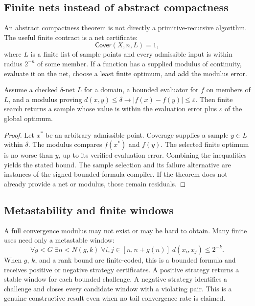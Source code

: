 \subsection{Finite nets instead of abstract compactness}

An abstract compactness theorem is not directly a primitive-recursive
algorithm.  The useful finite contract is a net certificate:
\[
 \mathsf{Cover}(X,n,L)=1,
\]
where \(L\) is a finite list of sample points and every admissible input is
within radius \(2^{-n}\) of some member.  If a function has a supplied modulus
of continuity, evaluate it on the net, choose a least finite optimum, and add
the modulus error.

\begin{theorem}
Assume a checked \(\delta\)-net \(L\) for a domain, a bounded evaluator for
\(f\) on members of \(L\), and a modulus proving
\(d(x,y)\le\delta\to |f(x)-f(y)|\le\varepsilon\).  Then finite search returns a
sample whose value is within the evaluation error plus \(\varepsilon\) of the
global optimum.
\end{theorem}

\begin{proof}
Let \(x^*\) be an arbitrary admissible point.  Coverage supplies a sample
\(y\in L\) within \(\delta\).  The modulus compares \(f(x^*)\) and \(f(y)\).
The selected finite optimum is no worse than \(y\), up to its verified
evaluation error.  Combining the inequalities yields the stated bound.  The
sample selection and its failure alternative are instances of the signed
bounded-formula compiler.  If the theorem does not already provide a net or
modulus, those remain residuals.
\end{proof}

\subsection{Metastability and finite windows}

A full convergence modulus may not exist or may be hard to obtain.  Many finite
uses need only a metastable window:
\[
 \forall g<G\;\exists n<N(g,k)\;
 \forall i,j\in[n,n+g(n)]\;d(x_i,x_j)\le2^{-k}.
\]
When \(g\), \(k\), and a rank bound are finite-coded, this is a bounded formula
and receives positive or negative strategy certificates.  A positive strategy
returns a stable window for each bounded challenge.  A negative strategy
identifies a challenge and closes every candidate window with a violating pair.
This is a genuine constructive result even when no tail convergence rate is
claimed.

